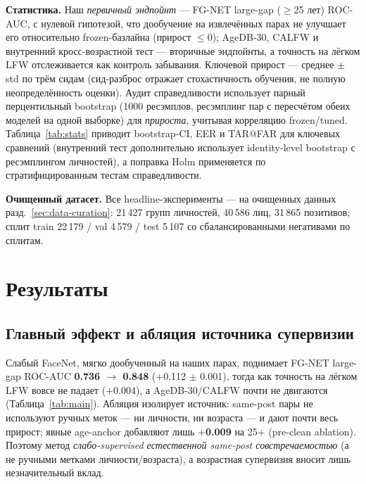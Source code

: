 \documentclass[journal]{IEEEtran}
\begin{document}
\textbf{Статистика.} Наш \emph{первичный эндпойнт} --- FG-NET large-gap ($\geq$25 лет) ROC-AUC, с нулевой гипотезой, что дообучение на извлечённых парах не улучшает его относительно frozen-базлайна (прирост $\leq 0$); AgeDB-30, CALFW и внутренний кросс-возрастной тест --- вторичные эндпойнты, а точность на лёгком LFW отслеживается как контроль забывания. Ключевой прирост --- среднее $\pm$ std по трём сидам (сид-разброс отражает стохастичность обучения, не полную неопределённость оценки). Аудит справедливости использует парный перцентильный bootstrap (1000 ресэмплов, ресэмплинг пар с пересчётом обеих моделей на одной выборке) для \emph{прироста}, учитывая корреляцию frozen/tuned. Таблица~\ref{tab:stats} приводит bootstrap-CI, EER и TAR@FAR для ключевых сравнений (внутренний тест дополнительно использует identity-level bootstrap с ресэмплингом личностей), а поправка Holm применяется по стратифицированным тестам справедливости.

\textbf{Очищенный датасет.} Все headline-эксперименты --- на очищенных данных разд.~\ref{sec:data-curation}: 21\,427 групп личностей, 40\,586 лиц, 31\,865 позитивов; сплит train 22\,179 / val 4\,579 / test 5\,107 со сбалансированными негативами по сплитам.

\section{Результаты}\label{sec:results}
\subsection{Главный эффект и абляция источника супервизии}\label{sec:res-main}
Слабый FaceNet, мягко дообученный на наших парах, поднимает FG-NET large-gap ROC-AUC \textbf{0.736 $\rightarrow$ 0.848} ($+$0.112 $\pm$ 0.001), тогда как точность на лёгком LFW вовсе не падает ($+$0.004), а AgeDB-30/CALFW почти не двигаются (Таблица~\ref{tab:main}). Абляция изолирует источник: same-post пары не используют ручных меток --- ни личности, ни возраста --- и дают почти весь прирост; явные age-anchor добавляют лишь \textbf{$+$0.009} на 25+ (pre-clean ablation). Поэтому метод \emph{слабо-supervised естественной same-post совстречаемостью} (а не ручными метками личности/возраста), а возрастная супервизия вносит лишь незначительный вклад.
\end{document}
